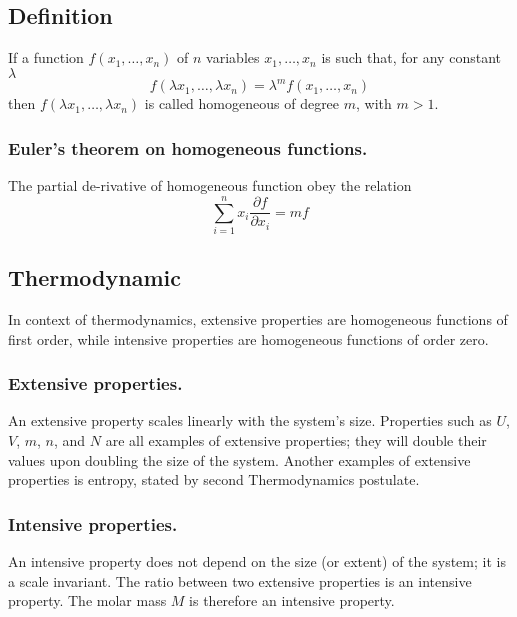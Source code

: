 \documentclass[../../../Main.tex]{subfiles}
\begin{document}
\subsection*{Definition}
If a function $f(x_1,\dots, x_n)$ of $n$ variables $x_1,\dots, x_n$ is such that, for any constant $\lambda$
\begin{equation*}
    f(\lambda x_1,\dots,\lambda x_n )=\lambda^mf( x_1,\dots, x_n )
\end{equation*}
then $f(\lambda x_1,\dots,\lambda x_n )$ is called homogeneous of degree $m$, with $m>1$.

\subsubsection*{Euler’s theorem on homogeneous functions.} The partial de-rivative of homogeneous function obey the relation 
\begin{equation*}
    \sum_{i=1}^{n }x_i\frac{\partial f}{\partial x_i}=mf
\end{equation*} 

\subsection*{Thermodynamic}
In context of thermodynamics, extensive properties are homogeneous functions of first order, while intensive properties are homogeneous functions of order zero. 
\subsubsection*{Extensive properties.} An extensive property scales linearly with the system’s size. Properties such as $U$, $V$, $m$, $n$, and $N$ are all examples of extensive properties; they will double their values upon doubling the size of the system.  Another examples of extensive properties is entropy, stated by second Thermodynamics postulate.

\subsubsection*{Intensive properties.} An intensive property does not depend on the size (or extent) of the system; it is a scale invariant. The ratio between two extensive properties is an intensive property. The molar mass $M$ is therefore an intensive property.
\end{document}
